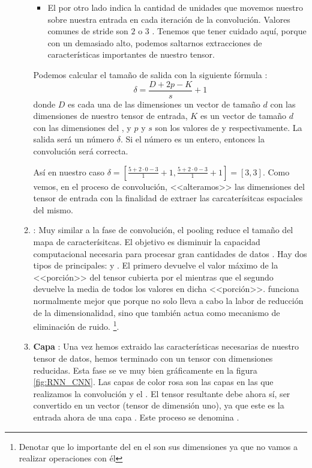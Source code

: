 \begin{itemize}
\begin{enumerate}
\begin{itemize}
                  \item El  por otro lado indica la cantidad de unidades que movemos nuestro  sobre nuestra entrada en cada iteración de la convolución. Valores comunes de stride son $2$ o $3$ . Tenemos que tener cuidado aquí, porque con un  demasiado alto, podemos saltarnos extracciones de características importantes de nuestro tensor.
                \end{itemize}

                Podemos calcular el tamaño de salida con la siguiente fórmula : \[\delta = \frac{D + 2p - K}{s} + 1\] donde $D$ es cada una de las dimensiones un vector de tamaño $d$ con las dimensiones de nuestro tensor de entrada, $K$ es un vector de tamaño $d$ con las dimensiones del , y $p$ y $s$ son los valores de  y  respectivamente. La salida será un número $\delta$. Si el número es un entero, entonces la convolución será correcta.

                Así en nuestro caso $\delta = [\frac{5 + 2 \cdot 0 - 3}{1} + 1, \frac{5 + 2 \cdot 0 - 3}{1} + 1] = [3, 3]$. Como vemos, en el proceso de convolución, <<alteramos>> las dimensiones del tensor de entrada con la finalidad de extraer las carcaterísitcas espaciales del mismo.

          \item \textbf{}: Muy similar a la fase de convolución, el pooling reduce el tamaño del mapa de caracterísitcas. El objetivo es disminuir la capacidad computacional necesaria para procesar gran cantidades de datos . Hay dos tipos de  principales:  y . El primero devuelve el valor máximo de la <<porción>> del tensor cubierta por el  mientras que el segundo devuelve la media de todos los valores en dicha <<porción>>.  funciona normalmente mejor que  porque no solo lleva a cabo la labor de reducción de la dimensionalidad, sino que también actua como mecanismo de eliminación de ruido. \footnote{Denotar que lo importante del  en el  son sus dimensiones ya que no vamos a realizar operaciones con él}.

          \item \textbf{Capa }: Una vez hemos extraido las características necesarias de nuestro tensor de datos, hemos terminado con un tensor con dimensiones reducidas. Esta fase se ve muy bien gráficamente en la figura \ref{fig:RNN_CNN}. Las capas de color rosa son las capas en las que realizamos la convolución y el . El tensor resultante debe ahora sí, ser convertido en un vector (tensor de dimensión uno), ya que este es la entrada ahora de una capa . Este proceso se denomina .


\end{enumerate}
\end{itemize}
